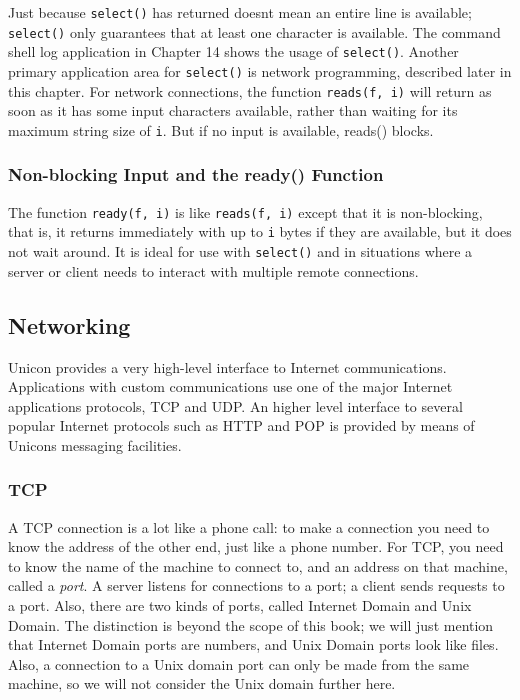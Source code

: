 
Just because \texttt{select()} has returned doesn{\textquotesingle}t
mean an entire line is available; \texttt{select()} only guarantees
that at least one character is available. The command shell log
application in Chapter 14 shows the usage of \texttt{select()}. Another
primary application area for \texttt{select()} is network programming,
described later in this chapter. For network connections, the function
\texttt{reads(f, i)} will return as soon as it has some input
characters available, rather than waiting for its maximum string size
of \texttt{i}. But if no input is available, reads() blocks.

\subsubsection[Non{}-blocking Input and the ready()
Function]{Non-blocking Input and the \textrm{ready()} Function}
The function \texttt{ready(f, i)} is like \texttt{reads(f, i)} except
that it is non-blocking, that is, it returns immediately with up to
\texttt{i} bytes if they are available, but it does not wait around. It
is ideal for use with \texttt{select()} and in situations where a
server or client needs to interact with multiple remote connections.

\subsection[Networking]{Networking}
Unicon provides a very high-level interface to
Internet communications. Applications with custom
communications use one of the major Internet
applications protocols, TCP and UDP. An higher level
interface to several popular Internet protocols such as HTTP and POP is
provided by means of Unicon{\textquotesingle}s messaging facilities.

\subsubsection{TCP}

A TCP connection is a lot like a phone call: to make a connection you
need to know the address of the other end, just like a phone number.
For TCP, you need to know the name of the machine to connect to, and an
address on that machine, called a \textit{port}. A server listens for
connections to a port; a client sends requests to a port. Also, there
are two kinds of ports, called {\textquotedbl}Internet
Domain{\textquotedbl} and {\textquotedbl}Unix Domain.{\textquotedbl}
The distinction is beyond the scope of this book; we will just mention
that Internet Domain ports are numbers, and Unix Domain ports look like
files. Also, a connection to a Unix domain port can only be made from
the same machine, so we will not consider the Unix domain further here.

